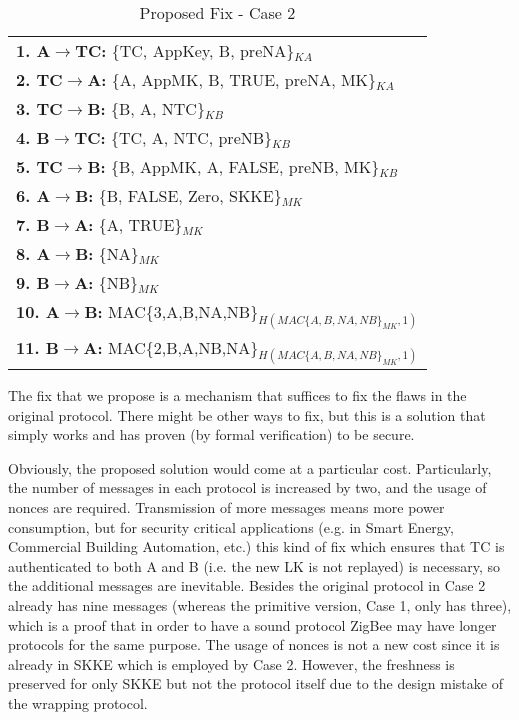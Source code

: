 \begin{table}\caption{Proposed Fix - Case 2}
\label{tab:fix2}
\centering
\begin{tabular}{l}
\hline
\textbf{1. A\(\rightarrow\)TC:} \{TC, AppKey, B, preNA\}$_{KA}$   \\
\textbf{2. TC\(\rightarrow\)A:} \{A, AppMK, B, TRUE, preNA, MK\}$_{KA}$ \\
\textbf{3. TC\(\rightarrow\)B:} \{B, A, NTC\}$_{KB}$ \\
\textbf{4. B\(\rightarrow\)TC:} \{TC, A, NTC, preNB\}$_{KB}$                 \\                           
\textbf{5. TC\(\rightarrow\)B:} \{B, AppMK, A, FALSE, preNB, MK\}$_{KB}$      \\                
\textbf{6. A\(\rightarrow\)B:} \{B, FALSE, Zero, SKKE\}$_{MK}$ \\
\textbf{7. B\(\rightarrow\)A:} \{A, TRUE\}$_{MK}$                 \\                           
\textbf{8. A\(\rightarrow\)B:} \{NA\}$_{MK}$      \\                
\textbf{9. B\(\rightarrow\)A:} \{NB\}$_{MK}$                  \\                       
\textbf{10. A\(\rightarrow\)B:} MAC\{3,A,B,NA,NB\}$_{H(MAC\{A,B,NA,NB\}_{MK},1)}$        \\
\textbf{11. B\(\rightarrow\)A:} MAC\{2,B,A,NB,NA\}$_{H(MAC\{A,B,NA,NB\}_{MK},1)}$        \\
\hline
\end{tabular}
\end{table}
The fix that we propose is a mechanism that suffices to fix the flaws in the original protocol. 
There might be other ways to fix, but this is a solution that simply
works and has proven (by formal verification) to be secure.

Obviously, the proposed solution would come at a particular
cost. Particularly, the
number of messages in each protocol is increased by two, and the usage of
nonces are required. Transmission of more messages means more power
consumption, but for security critical applications (e.g. in Smart
Energy, Commercial Building Automation, etc.)
 this kind of fix which ensures that TC is authenticated to both A and B (i.e. the new LK is not replayed)
is necessary, so the additional messages are inevitable.
Besides the original protocol in Case 2 already has nine messages (whereas the primitive version, Case 1, only has three), which is a proof that in order to
have a sound protocol ZigBee may have longer protocols for the same purpose.
The usage of nonces is not a new cost since it is already in SKKE which is employed by Case 2.
However, the freshness is preserved for only SKKE but not the protocol
itself due to the design mistake of the wrapping protocol.

